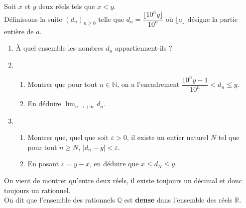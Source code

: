 \begin{enigme}


Soit $x$ et $y$ deux réels tels que $x<y$.\\
Définissons la suite  $(d_n)_{n\geqslant0}$ telle que $d_n=\dfrac{\lfloor10^n y\rfloor}{10^n}$ où $\lfloor a\rfloor$ désigne la partie entière de $a$.\\
\begin{enumerate}
\item À quel ensemble les nombres $d_n$  appartiennent-ils ? \hspace{1cm}
\begin{minipage}{0.5\linewidth}
\end{minipage}
\item
\begin{enumerate}
\item Montrer  que pour tout $n\in\mathbb{N}$, on a l'encadrement $\dfrac{10^ny-1}{10^n}< d_n\leqslant y$.
\item En déduire $\displaystyle\lim_{n\to+\infty}d_n$.
\end{enumerate}
\item \begin{enumerate}
\item Montrer que, quel que soit $\varepsilon>0$, il existe un entier naturel $N$ tel que pour tout $n\geqslant N$, $|d_n-y|< \varepsilon$.
\item En posant $\varepsilon=y-x$, en déduire que $x\leqslant d_N \leqslant y$.
\end{enumerate}
\end{enumerate}

\begin{center}
\begin{minipage}{1\linewidth}
\begin{cadre}[A1][A4]
On vient de montrer qu'entre deux réels, il existe toujours un décimal et donc toujours un rationnel.\\
On dit que l'ensemble des rationnels $\mathbb{Q}$ est \textbf{dense} dans l'ensemble des réels $\mathbb{R}$.
 \end{cadre}
\end{minipage}
\end{center}


\end{enigme}
